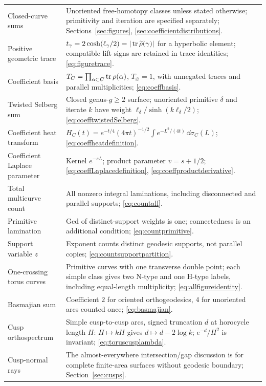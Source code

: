 \begin{longtable}{@{}>{\raggedright\arraybackslash}p{}
 >{\raggedright\arraybackslash}p{}@{}}
Closed-curve sums & Unoriented free-homotopy classes unless stated otherwise; primitivity and iteration are specified separately; Sections~\ref{sec:figures}, \ref{sec:coefficientdistributions}.\\
Positive geometric trace & $t_\gamma=2\cosh(\ell_\gamma/2)=|\operatorname{tr}\widetilde\rho(\gamma)|$ for a hyperbolic element; compatible lift signs are retained in trace identities; \eqref{eq:figuretrace}.\\
Coefficient basis & $T_C=\prod_{\alpha\subset C}\operatorname{tr}\rho(\alpha)$, $T_\varnothing=1$, with unnegated traces and parallel multiplicities; \eqref{eq:coeffbasis}.\\
Twisted Selberg sum & Closed genus-$g\ge2$ surface; unoriented primitive $\delta$ and iterate $k$ have weight $\ell_\delta/\sinh(k\ell_\delta/2)$; \eqref{eq:coefftwistedSelberg}.\\
Coefficient heat transform & $H_C(t)=e^{-t/4}(4\pi t)^{-1/2}\int e^{-L^2/(4t)}\,\dd\sigma_C(L)$; \eqref{eq:coeffheatdefinition}.\\
Coefficient Laplace parameter & Kernel $e^{-sL}$; product parameter $v=s+1/2$; \eqref{eq:coeffLaplacedefinition}, \eqref{eq:coeffproductderivative}.\\
Total multicurve count & All nonzero integral laminations, including disconnected and parallel supports; \eqref{eq:countall}.\\
Primitive lamination & Gcd of distinct-support weights is one; connectedness is an additional condition; \eqref{eq:countprimitive}.\\
Support variable $z$ & Exponent counts distinct geodesic supports, not parallel copies; \eqref{eq:countsupportpartition}.\\
One-crossing torus curves & Primitive curves with one transverse double point; each simple class gives two N-type and one H-type labels, including equal-length multiplicity; \eqref{eq:allfigureidentity}.\\
Basmajian sum & Coefficient $2$ for oriented orthogeodesics, $4$ for unoriented arcs counted once; \eqref{eq:basmajian}.\\
Cusp orthospectrum & Simple cusp-to-cusp arcs, signed truncation $d$ at horocycle length $H$: $H\mapsto kH$ gives $d\mapsto d-2\log k$; $e^{-d}/H^2$ is invariant; \eqref{eq:toruscusplambda}.\\
Cusp-normal rays & The almost-everywhere intersection/gap discussion is for complete finite-area surfaces without geodesic boundary; Section~\ref{sec:cusps}.\\

\end{longtable}
